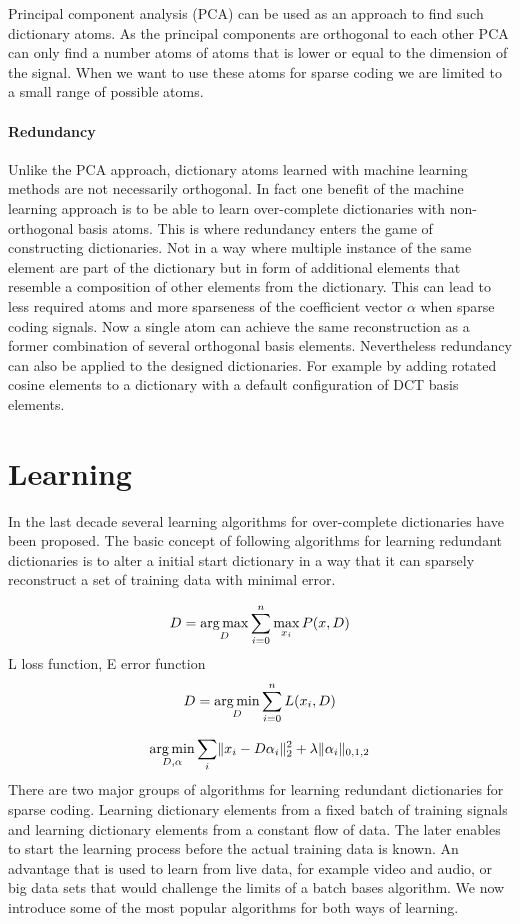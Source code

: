 Principal component analysis (PCA) can be used as an approach to find such
dictionary atoms. As the principal components are orthogonal to each other PCA
can only find a number atoms of atoms that is lower or equal to the dimension of
the signal. When we want to use these atoms for sparse coding we are limited to
a small range of possible atoms.

\paragraph{Redundancy} Unlike the PCA approach,
dictionary atoms learned with machine learning methods are not necessarily
orthogonal. In fact one benefit of the machine learning approach is to be able
to learn over-complete dictionaries with non-orthogonal basis atoms. This is
where redundancy enters the game of constructing dictionaries. Not in a way
where multiple instance of the same element are part of the dictionary but in
form of additional elements that resemble a composition of other elements from
the dictionary. This can lead to less required atoms and more sparseness of the
coefficient vector $\alpha$ when sparse coding signals. Now a single atom can
achieve the same reconstruction as a former combination of several orthogonal
basis elements. 
Nevertheless redundancy can also be applied to the designed
dictionaries. For example by adding rotated cosine elements to a dictionary with
a default configuration of DCT basis elements.


\section{Learning}
In the last decade several learning algorithms for over-complete dictionaries
have been proposed. The basic concept of following algorithms for learning
redundant dictionaries is to alter a initial start dictionary in a way that it
can sparsely reconstruct a set of training data with minimal error. 

\begin{align} 
D = \operatorname*{arg\,max}_{D} \sum_{i=0}^n \max_{x_i} P(x,D)
\end{align}
L loss function, E error function
\begin{align} 
D = \operatorname*{arg\,min}_{D} \sum_{i=0}^n L(x_i,D)
\end{align}

\begin{align} 
\operatorname*{arg\,min}_{D,\alpha} \sum_{i}
\lVert x_i - D\alpha_i \rVert^{2}_{2}  +  \lambda \lVert \alpha_i
\rVert_{0,1,2}
\end{align}
There are two major groups of algorithms for learning redundant dictionaries for
sparse coding. Learning dictionary elements from a fixed batch of training
signals and learning dictionary elements from a constant flow of data. The later
enables to start the learning process before the actual training data is known.
An advantage that is used to learn from live data, for example video and audio,
or big data sets that would challenge the limits of a batch bases algorithm. We
now introduce some of the most popular algorithms for both ways of learning.

